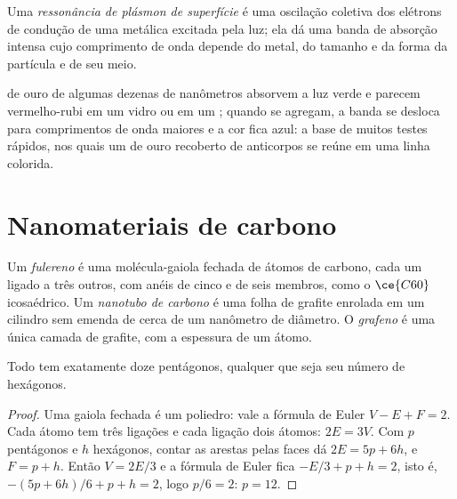\begin{definition}\label{def:b3:inorganic-materials:plasmon}
Uma \emph{ressonância de plásmon de superfície} é uma
oscilação coletiva dos elétrons de condução de uma  metálica
excitada pela luz; ela dá uma banda de absorção intensa cujo comprimento de onda depende do
metal, do tamanho e da forma da partícula e de seu meio.
\end{definition}

 de ouro de algumas dezenas de nanômetros absorvem a luz verde e parecem
vermelho-rubi em um vidro ou em um ; quando se agregam, a banda se desloca para
comprimentos de onda maiores e a cor fica azul: a base de muitos testes rápidos, nos quais
um  de ouro recoberto de anticorpos se reúne em uma linha colorida.

\section{Nanomateriais de carbono}

\begin{definition}\label{def:b3:inorganic-materials:carbon}
Um \emph{fulereno} é uma molécula-gaiola fechada de átomos de carbono,
cada um ligado a três outros, com anéis de cinco e de seis membros, como o
$\ce{C60}$ icosaédrico. Um \emph{nanotubo de carbono} é uma folha de
grafite enrolada em um cilindro sem emenda de cerca de um nanômetro de diâmetro.
O \emph{grafeno} é uma única camada de grafite, com a espessura de um átomo.
\end{definition}

\begin{proposition}\label{prop:b3:inorganic-materials:euler}
Todo  tem exatamente doze pentágonos, qualquer que seja seu número de
hexágonos.
\end{proposition}

\begin{proof}
Uma gaiola fechada é um poliedro: vale a fórmula de Euler $V - E + F = 2$. Cada átomo tem
três ligações e cada ligação dois átomos: $2E = 3V$. Com $p$ pentágonos e $h$ hexágonos,
contar as arestas pelas faces dá $2E = 5p + 6h$, e $F = p + h$. Então $V = 2E/3$ e a fórmula de
Euler fica $-E/3 + p + h = 2$, isto é, $-(5p + 6h)/6 + p + h = 2$, logo $p/6 = 2$: $p = 12$.
\end{proof}

